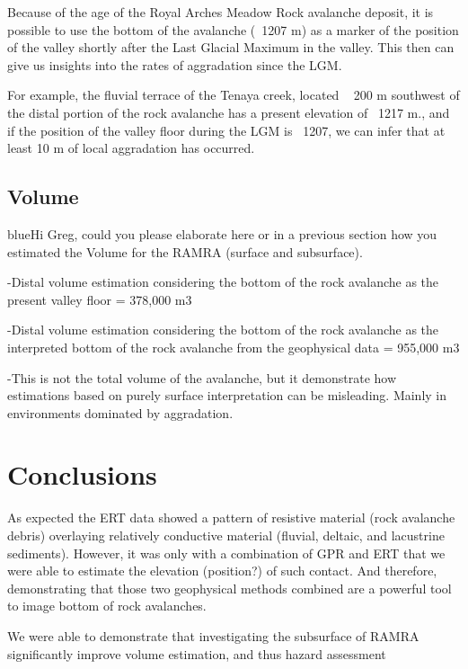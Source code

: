 \documentclass[5p]{elsarticle}
\newcommand{\COMON}{\begin{color}{blue}}
\newcommand{\COMOFF}{\end{color}}
\begin{document}
Because of the age of the Royal Arches Meadow Rock avalanche deposit, it is possible to use the bottom of the avalanche (~1207 m) as a marker of the position of the valley shortly after the Last Glacial Maximum in the valley. This then can give us insights into the rates of aggradation since the LGM. 

For example, the fluvial terrace of the Tenaya creek, located ~ 200 m southwest of the distal portion of the rock avalanche has a present elevation of ~1217 m., and if the position of the valley floor during the LGM is ~1207, we can infer that at least 10 m of local aggradation has occurred. 


\subsection{Volume}

\COMON Hi Greg, could you please elaborate here or in a previous section how you estimated the Volume for the RAMRA (surface and subsurface).
\COMOFF

-Distal volume estimation considering the bottom of the rock avalanche as the present valley floor =  378,000 m3

-Distal volume estimation considering the bottom of the rock avalanche as the interpreted bottom of the rock avalanche from the geophysical data = 955,000 m3 

-This is not the total volume of the avalanche, but it demonstrate how estimations based on purely surface interpretation can be misleading. Mainly in environments dominated by aggradation. 


\bigskip  


\section{Conclusions}


As expected the ERT data showed a pattern of resistive material (rock avalanche debris) overlaying relatively conductive material (fluvial, deltaic, and lacustrine sediments). However, it was only with a combination of GPR and ERT that we were able to estimate the elevation (position?) of such contact. And therefore, demonstrating that those two geophysical methods combined are a powerful tool to image bottom of rock avalanches.  

We were able to demonstrate that investigating the subsurface of RAMRA significantly improve volume estimation, and thus hazard assessment 
     
\end{document}
